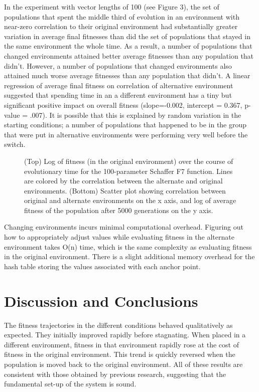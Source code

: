 \documentclass{sig-alternate}
\begin{document}
In the experiment with vector lengths of 100 (see Figure 3), the set of populations that spent the middle third of evolution in an environment with near-zero correlation to their original environment had substantially greater variation in average final fitnesses than did the set of populations that stayed in the same environment the whole time. As a result, a number of populations that changed environments attained better average fitnesses than any population that didn't. However, a number of populations that changed environments also attained much worse average fitnesses than any population that didn't. A linear regression of average final fitness on correlation of alternative environment suggested that spending time in an a different environment has a tiny but significant positive impact on overall fitness (slope=-0.002, intercept = 0.367, p-value = .007). It is possible that this is explained by random variation in the starting conditions; a number of populations that happened to be in the group that were put in alternative environments were performing very well before the switch.
\begin{figure}
\centering
{} 
\caption{(Top) Log of fitness (in the original environment) over the course of evolutionary time for the 100-parameter Schaffer F7 function. Lines are colored by the correlation between the alternate and original environments. (Bottom) Scatter plot showing correlation between original and alternate environments on the x axis, and log of average fitness of the population after 5000 generations on the y axis.}
\end{figure}

Changing environments incurs minimal computational overhead. Figuring out how to appropriately adjust values while evaluating fitness in the alternate environment takes O(n) time, which is the same complexity as evaluating fitness in the original environment. There is a slight additional memory overhead for the hash table storing the values associated with each anchor point.

\section{Discussion and Conclusions}
The fitness trajectories in the different conditions behaved qualitatively as expected. They initially improved rapidly before stagnating. When placed in a different environment, fitness in that environment rapidly rose at the cost of fitness in the original environment. This trend is quickly reversed when the population is moved back to the original environment. All of these results are consistent with those obtained by previous research, suggesting that the fundamental set-up of the system is sound.
\end{document}
